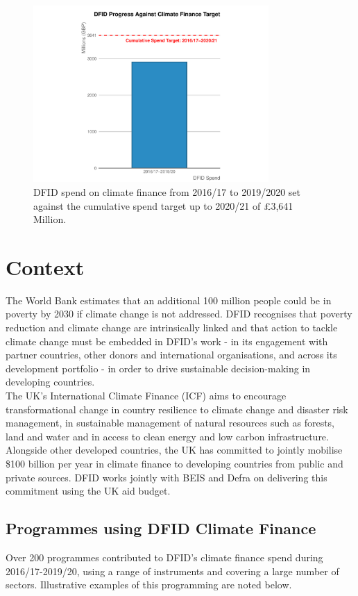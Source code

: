 \begin{figure}[htbp]
	\centering
	\includegraphics[width=0.8\textwidth]{../figs/climate_spend_plot} \hfill
	\caption{DFID spend on climate finance from 2016/17 to 2019/2020 set against the cumulative spend target up to 2020/21 of \pounds 3,641 Million.}
	\label{fig:climate_spend_plot}
\end{figure}

\section{Context}

The World Bank estimates that an additional 100 million people could be in poverty by 2030 if climate change is not addressed. %
DFID recognises that poverty reduction and climate change are intrinsically linked and that action to tackle climate change must be embedded in DFID's work - in its engagement with partner countries, other donors and international organisations, and across its development portfolio - in order to drive sustainable decision-making in developing countries. \\%

The UK's International Climate Finance (ICF) aims to encourage transformational change in country resilience to climate change and disaster risk management, in sustainable management of natural resources such as forests, land and water and in access to clean energy and low carbon infrastructure. %
Alongside other developed countries, the UK has committed to jointly mobilise \$100 billion per year in climate finance to developing countries from public and private sources. %
DFID works jointly with BEIS and Defra on delivering this commitment using the UK aid budget. %

\subsection{Programmes using DFID Climate Finance}
Over 200 programmes contributed to DFID's climate finance spend during 2016/17-2019/20, using a range of instruments and covering a large number of sectors. %
Illustrative examples of this programming are noted below. \\%

